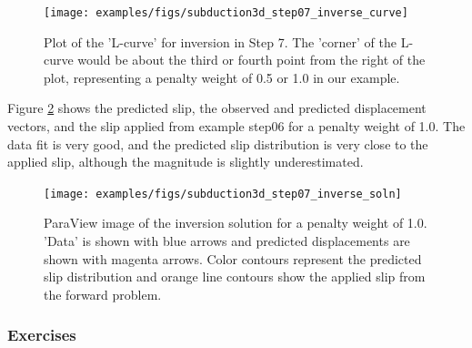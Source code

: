 \begin{figure}
  \texttt{[image: examples/figs/subduction3d\_step07\_inverse\_curve]}
  \caption{Plot of the 'L-curve' for inversion in Step 7. The
    'corner' of the L-curve would be about the third or fourth point
    from the right of the plot, representing a penalty weight of 0.5
    or 1.0 in our example. }
  \label{fig:example:subduction:3d:step07:optimal}
\end{figure}

Figure \ref{fig:example:subduction:3d:step07:soln} shows the
predicted slip, the observed and predicted displacement vectors, and
the slip applied from example step06 for a penalty weight of 1.0. The
data fit is very good, and the predicted slip distribution is very
close to the applied slip, although the magnitude is slightly
underestimated.

\begin{figure}
  \texttt{[image: examples/figs/subduction3d\_step07\_inverse\_soln]}
  \caption{ParaView image of the inversion solution for a penalty
    weight of 1.0. 'Data' is shown with blue arrows and predicted
    displacements are shown with magenta arrows. Color contours
    represent the predicted slip distribution and orange line contours
    show the applied slip from the forward problem.}
  \label{fig:example:subduction:3d:step07:soln}
\end{figure}

\subsubsection{Exercises}

